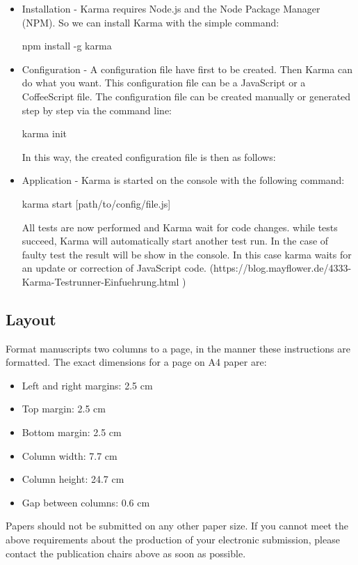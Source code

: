 \documentclass[11pt]{article}
\begin{document}
\begin{itemize}
\item Installation - Karma requires Node.js and the Node Package Manager (NPM). So we can install Karma with the simple command:

\textdollar{} npm install -g karma
\item Configuration - A configuration file have first to be created. Then Karma can do what you want. This configuration file can be a JavaScript or a CoffeeScript file. The configuration file can be created manually or generated step by step via the command line:

\textdollar{} karma init

In this way, the created configuration file is then as follows:
\item Application - Karma is started on the console with the following command:

\textdollar{} karma start [path/to/config/file.js]

All tests are now performed and Karma wait for code changes. while tests succeed, Karma will automatically start another test run. In the case of faulty test the result will be show in the console. In this case karma waits for an update or correction of JavaScript code. (https://blog.mayflower.de/4333-Karma-Testrunner-Einfuehrung.html )
\end{itemize}

\subsection{Layout}
\label{ssec:layout}

Format manuscripts two columns to a page, in the manner these
instructions are formatted. The exact dimensions for a page on A4
paper are:

\begin{itemize}
\item Left and right margins: 2.5 cm
\item Top margin: 2.5 cm
\item Bottom margin: 2.5 cm
\item Column width: 7.7 cm
\item Column height: 24.7 cm
\item Gap between columns: 0.6 cm
\end{itemize}

\noindent Papers should not be submitted on any other paper size.
 If you cannot meet the above requirements about the production of your electronic submission, please contact the publication chairs above as soon as possible.
\end{document}
